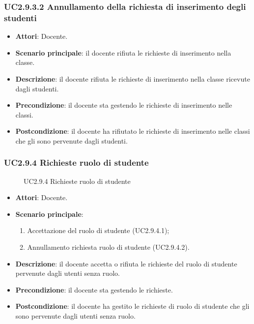 \subsubsection{UC2.9.3.2 Annullamento della richiesta di inserimento degli studenti}
\begin{itemize}
\item \textbf{Attori}: Docente.
\item \textbf{Scenario principale}: il docente rifiuta le richieste di inserimento nella classe.
\item \textbf{Descrizione}: il docente rifiuta le richieste di inserimento nella classe ricevute dagli studenti.
\item \textbf{Precondizione}: il docente sta gestendo le richieste di inserimento nelle classi.
\item \textbf{Postcondizione}: il docente ha rifiutato le richieste di inserimento nelle classi che gli sono pervenute dagli studenti.
\end{itemize}
\subsubsection{UC2.9.4 Richieste ruolo di studente}
\begin{figure}[H]
\centering
\noindent{}
\caption{UC2.9.4 Richieste ruolo di studente}
\end{figure}
\begin{itemize}
\item \textbf{Attori}: Docente.
\item \textbf{Scenario principale}:
\begin{enumerate}
\item Accettazione del ruolo di studente (UC2.9.4.1);
\item Annullamento richiesta ruolo di studente (UC2.9.4.2).
\end{enumerate}
\item \textbf{Descrizione}: il docente accetta o rifiuta le richieste del ruolo di studente pervenute dagli utenti senza ruolo.
\item \textbf{Precondizione}: il docente sta gestendo le richieste.
\item \textbf{Postcondizione}: il docente ha gestito le richieste di ruolo di studente che gli sono pervenute dagli utenti senza ruolo.
\end{itemize}
